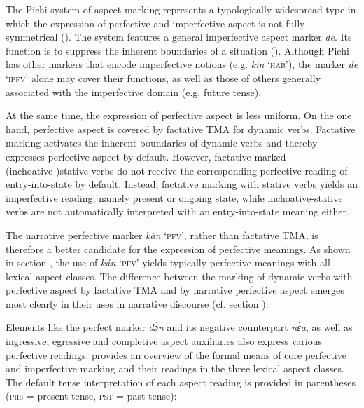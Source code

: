 The Pichi system of aspect marking represents a typologically widespread type in which the expression of perfective and imperfective aspect is not fully symmetrical (\citealt[69–102]{Dahl1985}). The system features a general imperfective aspect marker \textit{de}. Its function is to suppress the inherent boundaries of a situation (\citealt{Breu1985,Sasse1991a,Sasse1991}). Although Pichi has other markers that encode imperfective notions (e.g. \textit{kin} ‘\textsc{hab}’), the marker \textit{de} ‘\textsc{ipfv}’ alone may cover their functions, as well as those of others generally associated with the imperfective domain (e.g. future tense). 


At the same time, the expression of perfective aspect is less uniform. On the one hand, perfective aspect is covered by factative TMA for dynamic verbs. Factative marking activates the inherent boundaries of dynamic verbs and thereby expresses perfective aspect by default. However, factative marked (inchoative-)stative verbs do not receive the corresponding perfective reading of entry-into-state by default. Instead, factative marking with stative verbs yields an imperfective reading, namely present or ongoing state, while inchoative-stative verbs are not automatically interpreted with an entry-into-state meaning either. 



The narrative perfective marker \textit{kán} ‘\textsc{pfv}’, rather than factative TMA, is therefore a better candidate for the expression of perfective meanings. As shown in section , the use of \textit{kán} ‘\textsc{pfv’} yields typically perfective meanings with all lexical aspect classes. The difference between the marking of dynamic verbs with perfective aspect by factative TMA and by narrative perfective aspect emerges most clearly in their uses in narrative discourse (cf. section ).



Elements like the perfect marker \textit{dɔ́n} and its negative counterpart \textit{nɛ́a}, as well as ingressive, egressive and completive{\fff} aspect auxiliaries also express various perfective readings.  provides an overview of the formal means of core perfective and imperfective marking and their readings in the three lexical aspect classes. The default tense{\fff} interpretation of each aspect reading is provided in parentheses (\textsc{prs} = present tense{\fff}, \textsc{pst} = past tense{\fff}): 



